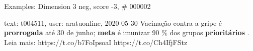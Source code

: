 \begin{frame}{Examples: Dimension 3 neg, score -3, \# 000002}
\footnotesize
\begin{alertblock}{text: t004511, user: aratuonline, 2020-05-30}
Vacinação contra a gripe é \textbf{prorrogada} até 30 de junho; \textbf{meta} é 
imunizar 90 \% dos grupos \textbf{prioritários} . Leia mais: 
https://t.co/b7FoIpsoaI https://t.co/Ch4IfjFStz 
\end{alertblock}
\end{frame}
